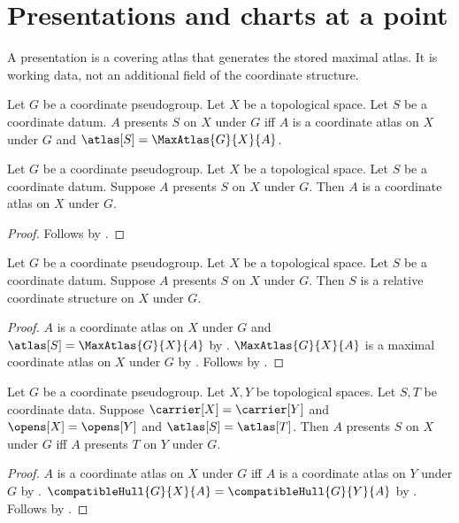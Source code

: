 \section{Presentations and charts at a point}



A presentation is a covering atlas that generates the stored maximal atlas.
It is working data, not an additional field of the coordinate structure.

\begin{definition}\label{coordinate_presentation}
    Let $G$ be a coordinate pseudogroup.
    Let $X$ be a topological space.
    Let $S$ be a coordinate datum.
    $A$ presents $S$ on $X$ under $G$ iff
        $A$ is a coordinate atlas on $X$ under $G$ and
        $\atlas[S]=\MaxAtlas{G}{X}{A}$.
\end{definition}

\begin{classification}\label{presentation_is_atlas}
    Let $G$ be a coordinate pseudogroup.
    Let $X$ be a topological space.
    Let $S$ be a coordinate datum.
    Suppose $A$ presents $S$ on $X$ under $G$.
    Then $A$ is a coordinate atlas on $X$ under $G$.
\end{classification}
\begin{proof}
    Follows by .
\end{proof}

\begin{classification}\label{presented_coordinates}
    Let $G$ be a coordinate pseudogroup.
    Let $X$ be a topological space.
    Let $S$ be a coordinate datum.
    Suppose $A$ presents $S$ on $X$ under $G$.
    Then $S$ is a relative coordinate structure on $X$ under $G$.
\end{classification}
\begin{proof}
    $A$ is a coordinate atlas on $X$ under $G$ and
        $\atlas[S]=\MaxAtlas{G}{X}{A}$ by .
    $\MaxAtlas{G}{X}{A}$ is a maximal coordinate atlas on $X$ under $G$ by
        .
    Follows by .
\end{proof}

\begin{theorem}\label{coordinate_presentation_same_fields}
    Let $G$ be a coordinate pseudogroup.
    Let $X,Y$ be topological spaces.
    Let $S,T$ be coordinate data.
    Suppose $\carrier[X]=\carrier[Y]$ and $\opens[X]=\opens[Y]$ and $\atlas[S]=\atlas[T]$.
    Then $A$ presents $S$ on $X$ under $G$ iff $A$ presents $T$ on $Y$ under $G$.
\end{theorem}
\begin{proof}
    $A$ is a coordinate atlas on $X$ under $G$ iff $A$ is a coordinate atlas on $Y$ under $G$ by
        .
    $\compatibleHull{G}{X}{A}=\compatibleHull{G}{Y}{A}$ by .
    Follows by .
\end{proof}


